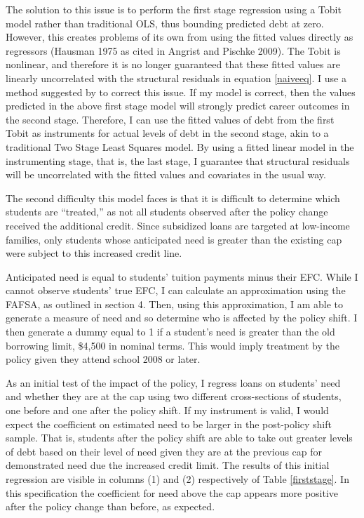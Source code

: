 \documentclass[12pt]{article}
\begin{document}
	The solution to this issue is to perform the first stage regression using a Tobit model rather than traditional OLS, thus bounding predicted debt at zero. However, this creates problems of its own from using the fitted values directly as regressors (Hausman 1975 as cited in Angrist and Pischke 2009).	 The Tobit is nonlinear, and therefore it is no longer guaranteed that these fitted values are linearly uncorrelated with the structural residuals in equation \ref{naiveeq}. I use a method suggested by \textcite{angrist2009} to correct this issue. If my model is correct, then the values predicted in the above first stage model will strongly predict career outcomes in the second stage. Therefore, I can use the fitted values of debt from the first Tobit as instruments for actual levels of debt in the second stage, akin to a traditional Two Stage Least Squares model. By using a fitted linear model in the instrumenting stage, that is, the last stage, I guarantee that structural residuals will be uncorrelated with the fitted values and covariates in the usual way. 
	
	The second difficulty this model faces is that it is difficult to determine which students are ``treated,'' as not all students observed after the policy change received the additional credit. Since subsidized loans are targeted at low-income families, only students whose anticipated need is greater than the existing cap were subject to this increased credit line. 
	
	Anticipated need is equal to students' tuition payments minus their EFC. While I cannot observe students' true EFC, I can calculate an approximation using the FAFSA, as outlined in section 4. Then, using this approximation, I am able to generate a measure of need and so determine who is affected by the policy shift. I then generate a dummy equal to 1 if a student's need is greater than the old borrowing limit, \$4,500 in nominal terms. This would imply treatment by the policy given they attend school 2008 or later.
	
	As an initial test of the impact of the policy, I regress loans on students' need and whether they are at the cap using two different cross-sections of students, one before and one after the policy shift. If my instrument is valid, I would expect the coefficient on estimated need to be larger in the post-policy shift sample. That is, students after the policy shift are able to take out greater levels of debt based on their level of need given they are at the previous cap for demonstrated need due the increased credit limit. The results of this initial regression are visible in columns (1) and (2) respectively of Table \ref{firststage}. In this specification the coefficient for need above the cap appears more positive after the policy change than before, as expected. 
	
\end{document}
